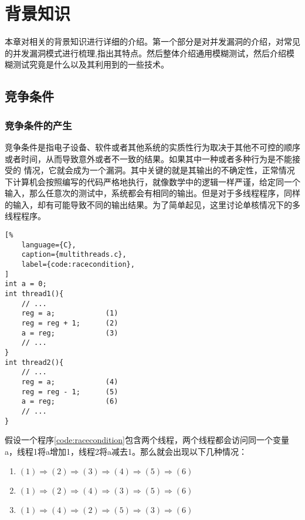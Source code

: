 \section{背景知识}

本章对相关的背景知识进行详细的介绍。第一个部分是对并发漏洞的介绍，对常见的并发漏洞模式进行梳理,指出其特点。然后整体介绍通用模糊测试，然后介绍模糊测试究竟是什么以及其利用到的一些技术。

\subsection{竞争条件}

\subsubsection{竞争条件的产生}

竞争条件是指电子设备、软件或者其他系统的实质性行为取决于其他不可控的顺序或者时间，从而导致意外或者不一致的结果。如果其中一种或者多种行为是不能接受的 情况，它就会成为一个漏洞。其中关键的就是其输出的不确定性，正常情况下计算机会按照编写的代码严格地执行，就像数学中的逻辑一样严谨，给定同一个输入，那么任意次的测试中，系统都会有相同的输出。但是对于多线程程序，同样的输入，却有可能导致不同的输出结果。为了简单起见，这里讨论单核情况下的多线程程序。

\begin{spacing}{1.0}
\begin{lstlisting}[%
    language={C},
    caption={multithreads.c},
    label={code:racecondition},
]
int a = 0;
int thread1(){
    // ...
    reg = a;            (1)
    reg = reg + 1;      (2)
    a = reg;            (3)
    // ...
}
int thread2(){
    // ...
    reg = a;            (4)
    reg = reg - 1;      (5)
    a = reg;            (6)
    // ...
}
\end{lstlisting}
\end{spacing}

假设一个程序\autoref{code:racecondition}包含两个线程，两个线程都会访问同一个变量a，线程1将a增加1，线程2将a减去1。那么就会出现以下几种情况：

\begin{enumerate}
\item $(1) \Rightarrow (2) \Rightarrow (3) \Rightarrow (4) \Rightarrow (5) \Rightarrow (6)$
\item $(1) \Rightarrow (2) \Rightarrow (4) \Rightarrow (3) \Rightarrow (5) \Rightarrow (6)$
\item $(1) \Rightarrow (4) \Rightarrow (2) \Rightarrow (5) \Rightarrow (3) \Rightarrow (6)$
\end{enumerate}

